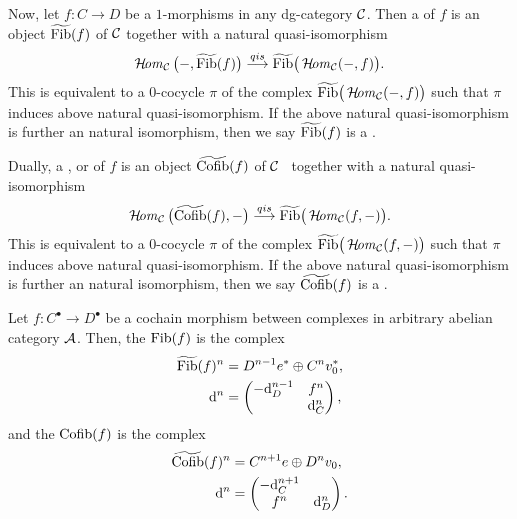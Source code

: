 {Now, let $f\colon C\to D$ be 
a $1$-morphisms in 
any dg-category ${\cal C}$. 
Then a  of $f$  
is an object $\widetilde{\mathrm{Fib}}(f)$ of ${\cal C}$ 
together with a natural quasi-isomorphism 
\[
\operatorname{\mathcal{H}\!\mathit{om}}_{{\cal C}}\big(-,\widetilde{\mathrm{Fib}}(f)\big)\stackrel{{qis}}{\longrightarrow} 
\widetilde{\mathrm{Fib}}\big(\operatorname{\mathcal{H}\!\mathit{om}}_{{\cal C}}(-,f)\big).
\]
This is equivalent to a $0$-cocycle $\pi$ of the complex
$\widetilde{\mathrm{Fib}}\big(\operatorname{\mathcal{H}\!\mathit{om}}_{{\cal C}}(-,f)\big)$
such that $\pi$ induces above 
natural quasi-isomorphism. 
If the above natural quasi-isomorphism 
is further an natural isomorphism, 
then we say $\widetilde{\mathrm{Fib}}(f)$ is 
a . 

Dually, a , 
or  of $f$ 
is an object $\widetilde{\mathrm{Cofib}}(f)$ of ${\cal C}$ \
together with a natural quasi-isomorphism 
\[
\operatorname{\mathcal{H}\!\mathit{om}}_{{\cal C}}\big(\widetilde{\mathrm{Cofib}}(f),-\big)\stackrel{{qis}}{\longrightarrow} 
\widetilde{\mathrm{Fib}}\big(\operatorname{\mathcal{H}\!\mathit{om}}_{{\cal C}}(f,-)\big).
\]
This is equivalent to a $0$-cocycle $\pi$ of the complex
$\widetilde{\mathrm{Fib}}\big(\operatorname{\mathcal{H}\!\mathit{om}}_{{\cal C}}(f,-)\big)$ 
such that $\pi$ induces above 
natural quasi-isomorphism. 
If the above natural quasi-isomorphism 
is further an natural isomorphism, 
then we say $\widetilde{\mathrm{Cofib}}(f)$ is 
a .

Let $f\colon C^{\bullet}\to D^{\bullet}$ 
be a cochain morphism between complexes 
in arbitrary abelian category ${\cal A}$. 
Then, the  $\mathrm{Fib}(f)$ 
is the complex 
\begin{align*}
\widetilde{\mathrm{Fib}}(f)^n &= 
D^{n-1}e^{\ast}\oplus C^nv_0^{\ast}, \\
\mathrm{d}^n &= 
\begin{pmatrix}
-\mathrm{d}_D^{n-1} & f^n \\
 & \mathrm{d}_C^n
\end{pmatrix},
\end{align*}
and the  $\mathrm{Cofib}(f)$ 
is the complex 
\begin{align*}
\widetilde{\mathrm{Cofib}}(f)^n &= 
C^{n+1}e\oplus D^nv_0, \\
\mathrm{d}^n &= 
\begin{pmatrix}
-\mathrm{d}_C^{n+1} & \\
f^n & \mathrm{d}_D^n
\end{pmatrix}.
\end{align*}

}
